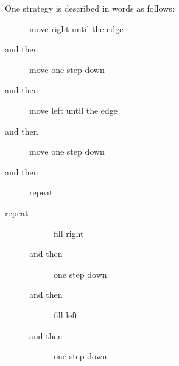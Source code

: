 \documentclass[10pt]{beamer}
\begin{document}
\begin{frame}[fragile]
  One strategy is described in words as follows:
  \begin{description}
      \item[] move right until the edge
      \item[and then] move one step down
      \item[and then] move left until the edge
      \item[and then] move one step down
      \item[and then] repeat
  \end{description}
\end{frame}
\begin{frame}[fragile]
  \begin{description}
    \item[repeat]
    \item[]
      \begin{description}
      \item[] fill right
      \item[and then] one step down
      \item[and then] fill left
      \item[and then] one step down
  \end{description}
  \end{description}
\end{frame}
\end{document}
